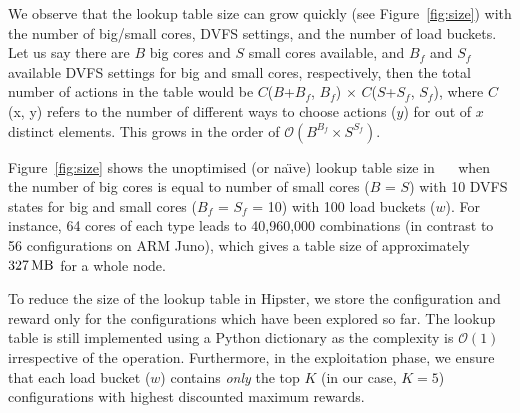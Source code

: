  We observe that the lookup table size can grow quickly (see Figure~\ref{fig:size}) with
the number of big/small cores, DVFS settings, and the number of load buckets. Let us say
there are $B$ big cores and $S$ small cores available, and $B_{f}$ and $S_{f}$ available
DVFS settings for big and small cores, respectively, then the total number of actions in
the table would be $C$($B$+$B_{f}$, $B_{f}$) $\times$ $C$($S$+$S_{f}$, $S_{f}$), where
$C$(x, y) refers to the number of different ways to choose actions ($y$) for out of $x$
distinct elements. This grows in the order of $\mathcal{O}(B^{B_{f}} \times S^{S_{f}})$.



 Figure~\ref{fig:size} shows the unoptimised (or na\"{\i}ve) lookup table size in
\SI{}{\kilo\byte} when the number of big cores is equal to number of small cores ($B$ =
$S$) with 10 DVFS states for big and small cores ($B_{f}$ = $S_{f}$ = 10) with 100 load
buckets ($w$). For instance, 64 cores of each type leads to 40,960,000 combinations (in
contrast to 56 configurations on ARM Juno), which gives a table size of approximately
$\SI{327}{\mega\byte}$ for a whole node.  

To reduce the size of the lookup table in Hipster, we store the configuration and reward
only for the configurations which have been explored so far. The lookup table is still
implemented using a Python dictionary as the complexity is $\mathcal{O}(1)$ irrespective
of the operation. Furthermore, in the exploitation phase, we ensure that each load bucket
($w$) contains \emph{only} the top $K$ (in our case, $K=5$) configurations with highest
discounted maximum rewards. 

